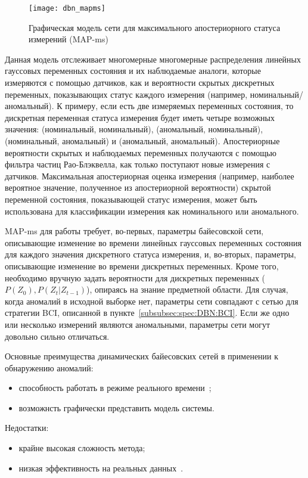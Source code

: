 \begin{figure}[h]
\texttt{[image: dbn\_mapms]}
\caption{Графическая модель сети для максимального апостериорного статуса измерений (MAP-ms)}
\label{fig:spec:DBN:MAPms}
\end{figure}

Данная модель отслеживает многомерные многомерные распределения линейных гауссовых переменных состояния и их наблюдаемые аналоги, которые измеряются с помощью датчиков, как и вероятности скрытых дискретных переменных, показывающих статус каждого измерения (например, номинальный/аномальный). К примеру, если есть две измеряемых переменных состояния, то дискретная переменная статуса измерения будет иметь четыре возможных значения: (номинальный, номинальный), (аномальный, номинальный), (номинальный, аномальный) и (аномальный, аномальный). Апостериорные вероятности скрытых и наблюдаемых переменных получаются с помощью фильтра частиц Рао-Блэквелла, как только поступают новые измерения с датчиков. Максимальная апостериорная оценка измерения (например, наиболее вероятное значение, полученное из апостериорной вероятности) скрытой переменной состояния, показывающей статус измерения, может быть использована для классификации измерения как номинального или аномального. 

MAP-ms для работы требует, во-первых, параметры байесовской сети, описывающие изменение во времени линейных гауссовых переменных состояния для каждого значения дискретного статуса измерения, и, во-вторых, параметры, описывающие изменение во времени дискретных переменных. Кроме того, необходимо вручную задать вероятности для дискретных переменных ($P(Z_0), P(Z_t|Z_{t-1})$), опираясь на знание предметной области. Для случая, когда аномалий в исходной выборке нет, параметры сети совпадают с сетью для стратегии BCI, описанной в пункте~\ref{subsubsec:spec:DBN:BCI}. Если же одно или несколько измерений являются аномальными, параметры сети могут довольно сильно отличаться.~\cite{DBNAnomalyDetection}

Основные преимущества динамических байесовских сетей в применении к обнаружению аномалий:
\begin{itemize}
	\item способность работать в режиме реального времени~\cite{DBNAnomalyDetection};
	\item возможнсть графически представить модель системы.
\end{itemize}

Недостатки:
\begin{itemize}
	\item крайне высокая сложность метода;
	\item низкая эффективность на реальных данных~\cite{MartinCompUnsupervisedDetectionMethods}.
\end{itemize}